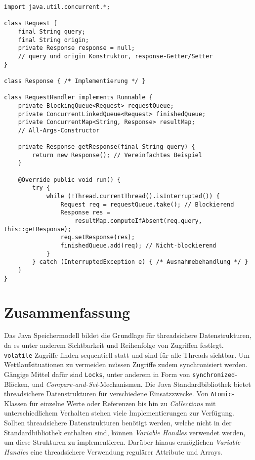 \documentclass[a4paper, 11pt]{article}
\begin{document}
\begin{lstfloat}
	\begin{lstlisting}[label={lst:collections:example}, caption={Request Handler mit Ergebnisspeicherung}]
import java.util.concurrent.*;

class Request {
	final String query;
	final String origin;
	private Response response = null;
	// query und origin Konstruktor, response-Getter/Setter
}

class Response { /* Implementierung */ }

class RequestHandler implements Runnable {
	private BlockingQueue<Request> requestQueue;
	private ConcurrentLinkedQueue<Request> finishedQueue;
	private ConcurrentMap<String, Response> resultMap;
	// All-Args-Constructor
	
	private Response getResponse(final String query) {
		return new Response(); // Vereinfachtes Beispiel
	}
	
	@Override public void run() {
		try {
			while (!Thread.currentThread().isInterrupted()) {
				Request req = requestQueue.take(); // Blockierend
				Response res = 
					resultMap.computeIfAbsent(req.query, this::getResponse);
				req.setResponse(res);
				finishedQueue.add(req); // Nicht-blockierend
			}
		} catch (InterruptedException e) { /* Ausnahmebehandlung */ }
	}
}
	\end{lstlisting}
\end{lstfloat}


\section{Zusammenfassung}
\label{sec:summary}

Das Java Speichermodell bildet die Grundlage für threadsichere Datenstrukturen, da es unter anderem Sichtbarkeit und Reihenfolge von Zugriffen festlegt.
\verb|volatile|-Zugriffe finden sequentiell statt und sind für alle Threads sichtbar.
Um Wettlaufsituationen zu vermeiden müssen Zugriffe zudem synchronisiert werden.
Gängige Mittel dafür sind \verb|Locks|, unter anderem in Form von \verb|synchronized|-Blöcken, und \textit{Compare-and-Set}-Mechanismen.
Die Java Standardbibliothek bietet threadsichere Datenstrukturen für verschiedene Einsatzzwecke.
Von \verb|Atomic|-Klassen für einzelne Werte oder Referenzen bis hin zu \textit{Collections} mit unterschiedlichem Verhalten stehen viele Implementierungen zur Verfügung.
Sollten threadsichere Datenstrukturen benötigt werden, welche nicht in der Standardbibliothek enthalten sind, können \textit{Variable Handles} verwendet werden, um diese Strukturen zu implementieren.
Darüber hinaus ermöglichen \textit{Variable Handles} eine threadsichere Verwendung regulärer Attribute und Arrays.

\printbibliography[title={Referenzen}]

\end{document}
